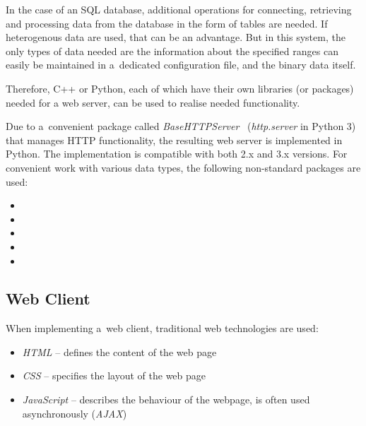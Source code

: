In the case of an SQL database, additional operations for connecting, retrieving
and processing data from the database in the form of tables are needed.
If heterogenous data are used, that can be an advantage. But in this system,
the only types of data needed are the information about the specified ranges
can easily be maintained in a~dedicated configuration file, and the binary data itself. 

Therefore, C++ or Python, each of which have their own libraries (or packages)
needed for a web server, can be used to realise needed functionality.

Due to a~convenient package called \textit{BaseHTTPServer}~\cite{httpserver}
(\textit{http.server} in Python 3) that manages HTTP functionality, the resulting
web server is implemented in Python. The implementation is compatible with
both 2.x and 3.x versions. For convenient work with various data types, the following non-standard packages are used:

\begin{itemize}
\item {} 
\item {} 
\item {} 
\item {} 
\item {} 
\end{itemize}

\subsection{Web Client}
When implementing a~web client, traditional web technologies are used:

\begin{itemize}
  \item \textit{HTML} -- defines the content of the web page
  \item \textit{CSS} -- specifies the layout of the web page
  \item \textit{JavaScript} -- describes the behaviour of the webpage, is often used asynchronously (\textit{AJAX})
\end{itemize}

